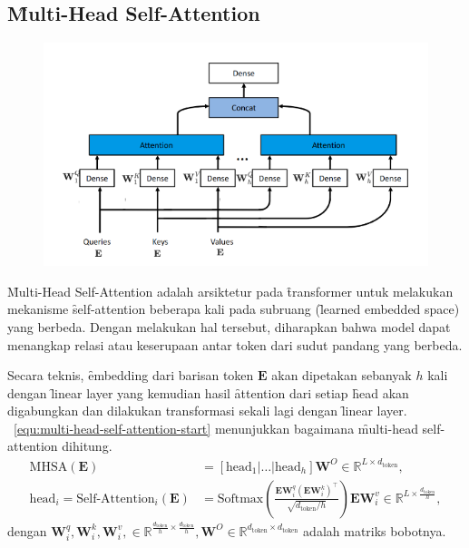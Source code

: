 	\subsection{\f{Multi-Head Self-Attention}}
	\begin{figure}[!ht]
		\centering
		\includegraphics[width=1\textwidth]{assets/pics/MHSA.png}
		\label{fig:multi-head-self-attention}
	\end{figure}

	\f{Multi-Head Self-Attention} adalah arsiktetur pada \f{transformer} untuk melakukan mekanisme \f{self-attention} beberapa kali pada subruang (\f{learned embedded space}) yang berbeda. Dengan melakukan hal tersebut, diharapkan bahwa model dapat menangkap relasi atau keserupaan antar token dari sudut pandang yang berbeda. 

	Secara teknis, \f{embedding} dari barisan token $\mathbf{E}$ akan dipetakan sebanyak $h$ kali dengan \f{linear layer} yang kemudian hasil \f{attention} dari setiap \f{head} akan digabungkan dan dilakukan transformasi sekali lagi dengan \f{linear layer}. \equ~\ref{equ:multi-head-self-attention-start} menunjukkan bagaimana \f{multi-head self-attention} dihitung.
	\begin{align}
		\label{equ:multi-head-self-attention-start}
		\text{MHSA}(\mathbf{E}) &= [\text{head}_1 | \dots | \text{head}_h] \mathbf{W}^O \in \mathbb{R}^{L \times d_{\text{token}}}, \\
		\text{head}_i = \text{Self-Attention}_i(\mathbf{E}) &= \text{Softmax}(\frac{\mathbf{E} \mathbf{W}^q_i (\mathbf{E} \mathbf{W}^k_i)^{\top}}{\sqrt{d_{\text{token}}/h}}) \mathbf{E} \mathbf{W}^v_i  \in  \mathbb{R}^{L \times \frac{d_{\text{token}}}{h}},
	\end{align}
	dengan $\mathbf{W}^q_i, \mathbf{W}^k_i, \mathbf{W}^v_i,\in \mathbb{R}^{\frac{d_{\text{token}}}{h} \times \frac{d_{\text{token}}}{h}}, \mathbf{W}^O \in \mathbb{R}^{d_{\text{token}} \times d_{\text{token}}}$ adalah matriks bobotnya.

